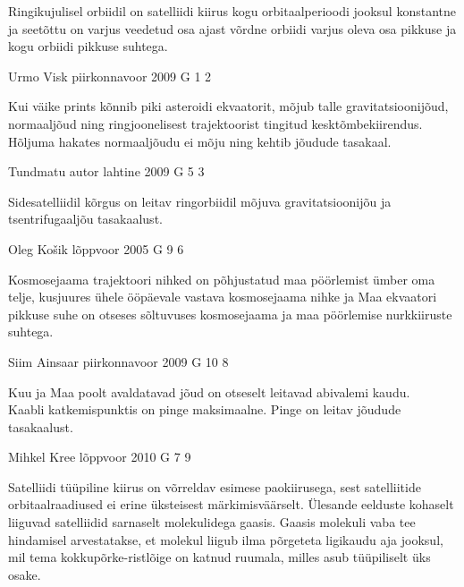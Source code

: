 \documentclass[11pt, twoside]{article}
\begin{document}
{{\ifHint
Ringikujulisel orbiidil on satelliidi kiirus kogu orbitaalperioodi jooksul konstantne ja seetõttu on varjus veedetud osa ajast võrdne orbiidi varjus oleva osa pikkuse ja kogu orbiidi pikkuse suhtega.
\fi
}

{Urmo Visk} %
{piirkonnavoor} %
{2009} %
{G 1} %
{2} %
{

\ifHint
Kui väike prints kõnnib piki asteroidi ekvaatorit, mõjub talle gravitatsioonijõud, normaaljõud ning ringjoonelisest trajektoorist tingitud kesktõmbekiirendus. Hõljuma hakates normaaljõudu ei mõju ning kehtib jõudude tasakaal.
\fi
}

{Tundmatu autor} %
{lahtine} %
{2009} %
{G 5} %
{3} %
{

\ifHint
Sidesatelliidil kõrgus on leitav ringorbiidil mõjuva gravitatsioonijõu ja tsentrifugaaljõu tasakaalust.
\fi
}

{Oleg Košik} %
{lõppvoor} %
{2005} %
{G 9} %
{6} %
{

\ifHint
Kosmosejaama trajektoori nihked on põhjustatud maa pöörlemist ümber oma telje, kusjuures ühele ööpäevale vastava kosmosejaama nihke ja Maa ekvaatori pikkuse suhe on otseses sõltuvuses kosmosejaama ja maa pöörlemise nurkkiiruste suhtega.
\fi
}

{Siim Ainsaar} %
{piirkonnavoor} %
{2009} %
{G 10} %
{8} %
{

\ifHint
\osa Kuu ja Maa poolt avaldatavad jõud on otseselt leitavad abivalemi kaudu.\\
\osa Kaabli katkemispunktis on pinge maksimaalne. Pinge on leitav jõudude tasakaalust.
\fi
}

{Mihkel Kree} %
{lõppvoor} %
{2010} %
{G 7} %
{9} %
{

\ifHint
Satelliidi tüüpiline kiirus on võrreldav esimese paokiirusega, sest satelliitide orbitaalraadiused ei erine üksteisest märkimisväärselt. Ülesande eelduste kohaselt liiguvad satelliidid sarnaselt molekulidega gaasis. Gaasis molekuli vaba tee hindamisel arvestatakse, et molekul liigub ilma põrgeteta ligikaudu aja jooksul, mil tema kokkupõrke-ristlõige on katnud ruumala, milles asub tüüpiliselt üks osake.
\fi
}

}
\end{document}
